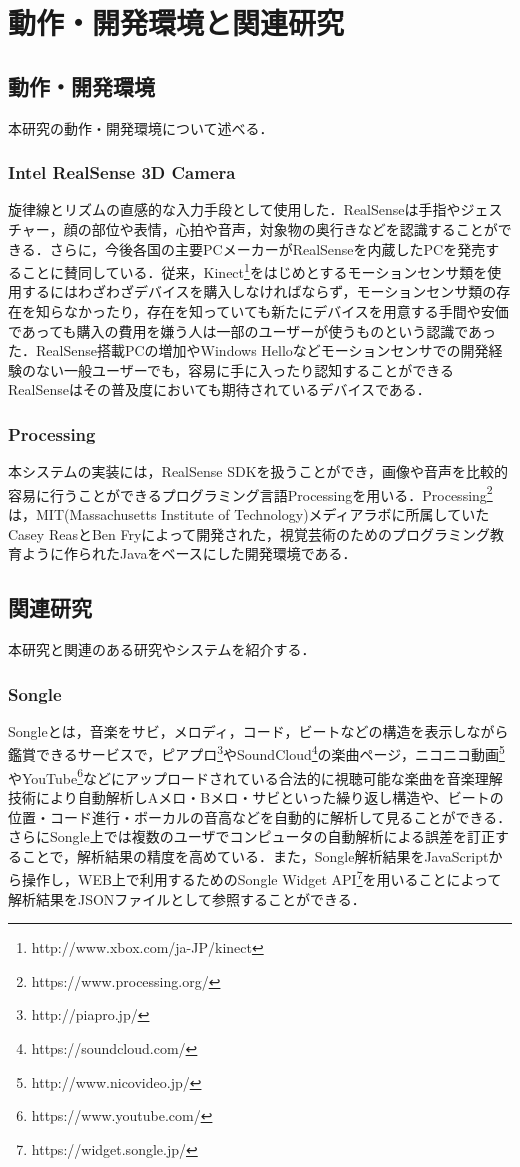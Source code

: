 \chapter{動作・開発環境と関連研究}
\section{動作・開発環境}
本研究の動作・開発環境について述べる．

\subsection{Intel RealSense 3D Camera}
旋律線とリズムの直感的な入力手段として使用した．RealSenseは手指やジェスチャー，顔の部位や表情，心拍や音声，対象物の奥行きなどを認識することができる．さらに，今後各国の主要PCメーカーがRealSenseを内蔵したPCを発売することに賛同している．従来，Kinect\footnote{http://www.xbox.com/ja-JP/kinect}をはじめとするモーションセンサ類を使用するにはわざわざデバイスを購入しなければならず，モーションセンサ類の存在を知らなかったり，存在を知っていても新たにデバイスを用意する手間や安価であっても購入の費用を嫌う人は一部のユーザーが使うものという認識であった．RealSense搭載PCの増加やWindows Helloなどモーションセンサでの開発経験のない一般ユーザーでも，容易に手に入ったり認知することができるRealSenseはその普及度においても期待されているデバイスである．

\subsection{Processing}
本システムの実装には，RealSense SDKを扱うことができ，画像や音声を比較的容易に行うことができるプログラミング言語Processingを用いる．Processing\footnote{https://www.processing.org/}は，MIT(Massachusetts Institute of Technology)メディアラボに所属していたCasey ReasとBen Fryによって開発された，視覚芸術のためのプログラミング教育ように作られたJavaをベースにした開発環境である．\cite{takahasi2010}
\section{関連研究}
本研究と関連のある研究やシステムを紹介する．

\subsection{Songle}
Songle\cite{songle}とは，音楽をサビ，メロディ，コード，ビートなどの構造を表示しながら鑑賞できるサービスで，ピアプロ\footnote{http://piapro.jp/}やSoundCloud\footnote{https://soundcloud.com/}の楽曲ページ，ニコニコ動画\footnote{http://www.nicovideo.jp/}やYouTube\footnote{https://www.youtube.com/}などにアップロードされている合法的に視聴可能な楽曲を音楽理解技術により自動解析しAメロ・Bメロ・サビといった繰り返し構造や、ビートの位置・コード進行・ボーカルの音高などを自動的に解析して見ることができる．さらにSongle上では複数のユーザでコンピュータの自動解析による誤差を訂正することで，解析結果の精度を高めている．また，Songle解析結果をJavaScriptから操作し，WEB上で利用するためのSongle Widget API\footnote{https://widget.songle.jp/}を用いることによって解析結果をJSONファイルとして参照することができる．

